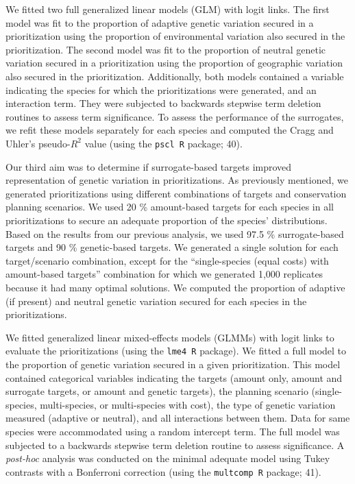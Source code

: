\documentclass[9pt,twocolumn,twoside,lineno]{pnas-new}
\begin{document}
We fitted two full generalized linear models (GLM) with logit links. The
first model was fit to the proportion of adaptive genetic variation
secured in a prioritization using the proportion of environmental
variation also secured in the prioritization. The second model was fit
to the proportion of neutral genetic variation secured in a
prioritization using the proportion of geographic variation also secured
in the prioritization. Additionally, both models contained a variable
indicating the species for which the prioritizations were generated, and
an interaction term. They were subjected to backwards stepwise term
deletion routines to assess term significance. To assess the performance
of the surrogates, we refit these models separately for each species and
computed the Cragg and Uhler's pseudo-\(R^2\) value (using the
\texttt{pscl R} package; 40).

Our third aim was to determine if surrogate-based targets improved
representation of genetic variation in prioritizations. As previously
mentioned, we generated prioritizations using different combinations of
targets and conservation planning scenarios. We used 20 \% amount-based
targets for each species in all prioritizations to secure an adequate
proportion of the species' distributions. Based on the results from our
previous analysis, we used 97.5 \% surrogate-based targets and 90 \%
genetic-based targets. We generated a single solution for each
target/scenario combination, except for the ``single-species (equal
costs) with amount-based targets'' combination for which we generated
1,000 replicates because it had many optimal solutions. We computed the
proportion of adaptive (if present) and neutral genetic variation
secured for each species in the prioritizations.

We fitted generalized linear mixed-effects models (GLMMs) with logit
links to evaluate the prioritizations (using the \texttt{lme4 R}
package). We fitted a full model to the proportion of genetic variation
secured in a given prioritization. This model contained categorical
variables indicating the targets (amount only, amount and surrogate
targets, or amount and genetic targets), the planning scenario
(single-species, multi-species, or multi-species with cost), the type of
genetic variation measured (adaptive or neutral), and all interactions
between them. Data for same species were accommodated using a random
intercept term. The full model was subjected to a backwards stepwise
term deletion routine to assess significance. A \emph{post-hoc} analysis
was conducted on the minimal adequate model using Tukey contrasts with a
Bonferroni correction (using the \texttt{multcomp R} package; 41).
\end{document}
